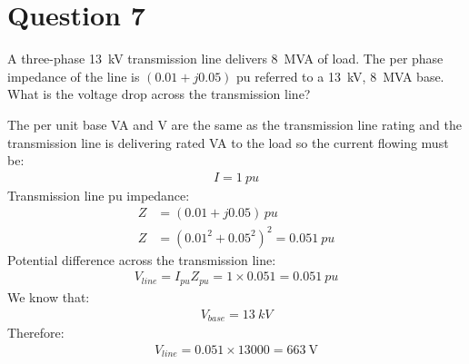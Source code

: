 \section{Question 7}
A three-phase \SI{13}{\kilo\volt} transmission line delivers \SI{8}{MVA} of load. The per phase impedance of the line is $\left(0.01+j0.05\right)$ pu referred to a \SI{13}{\kilo\volt}, \SI{8}{MVA} base. What is the voltage drop across the transmission line?

The per unit base VA and V are the same as the transmission line rating and the transmission line is delivering rated VA to the load so the current flowing must be:
\begin{gather}
    I = \SI{1}{pu}
\end{gather}
Transmission line pu impedance:
\begin{align}
    Z &= \left(0.01+j0.05\right)\, \si{pu}\\
    Z &= \left(0.01^2+0.05^2\right)^2 = \SI{0.051}{pu}
\end{align}
Potential difference across the transmission line:
\begin{gather}
    V_{line} = I_{pu}Z_{pu} = 1\times 0.051 = \SI{0.051}{pu}
\end{gather}
We know that:
\begin{gather}
    V_{base} = \SI{13}{kV}
\end{gather}
Therefore:
\begin{gather}
    V_{line} = 0.051\times 13000 = \SI{663}{\volt}
\end{gather}
